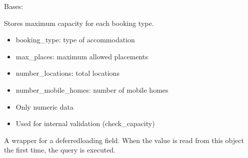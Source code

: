 \documentclass[letterpaper,10pt,english]{sphinxmanual}
\begin{document}
\begin{fulllineitems}
\label{\detokenize{index:bookings.models.Capacity}}
\pysigstartsignatures
\pysiglinewithargsret
{}
{\sphinxparamcomma {}}
{}
\pysigstopsignatures
\sphinxAtStartPar
Bases: 

\sphinxAtStartPar
Stores maximum capacity for each booking type.
\begin{description}
\begin{itemize}
\item {} 
\sphinxAtStartPar
booking\_type: type of accommodation

\item {} 
\sphinxAtStartPar
max\_places: maximum allowed placements

\item {} 
\sphinxAtStartPar
number\_locations: total locations

\item {} 
\sphinxAtStartPar
number\_mobile\_homes: number of mobile homes

\end{itemize}

\begin{itemize}
\item {} 
\sphinxAtStartPar
Only numeric data

\item {} 
\sphinxAtStartPar
Used for internal validation (check\_capacity)

\end{itemize}

\end{description}

\begin{fulllineitems}
\label{\detokenize{index:bookings.models.Capacity.booking_type}}
\pysigstartsignatures
\pysigline
{}
\pysigstopsignatures
\sphinxAtStartPar
A wrapper for a deferred\sphinxhyphen{}loading field. When the value is read from this
object the first time, the query is executed.

\end{fulllineitems}


\end{fulllineitems}
\end{document}
